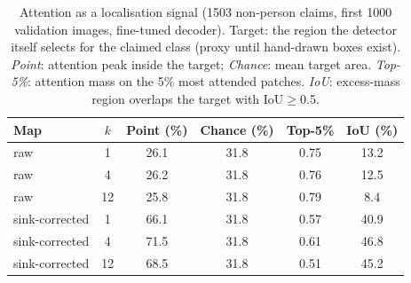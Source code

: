 \begin{table}[t]
\caption{Attention as a localisation signal (1503 non-person claims, first 1000 validation images,
fine-tuned decoder). Target: the region the detector itself selects
for the claimed class (proxy until hand-drawn boxes exist). \emph{Point}: attention peak inside the target;
\emph{Chance}: mean target area. \emph{Top-5\%}: attention mass on the 5\% most attended patches.
\emph{IoU}: excess-mass region overlaps the target with IoU$\geq$0.5.}
\label{tab:attn}
\centering\footnotesize\setlength{\tabcolsep}{4pt}
\begin{tabular}{@{}lccccc@{}}
\toprule
Map & $k$ & Point (\%) & Chance (\%) & Top-5\% & IoU (\%) \\
\midrule
raw & 1 & 26.1 & 31.8 & 0.75 & 13.2 \\
raw & 4 & 26.2 & 31.8 & 0.76 & 12.5 \\
raw & 12 & 25.8 & 31.8 & 0.79 & 8.4 \\
sink-corrected & 1 & 66.1 & 31.8 & 0.57 & 40.9 \\
sink-corrected & 4 & 71.5 & 31.8 & 0.61 & 46.8 \\
sink-corrected & 12 & 68.5 & 31.8 & 0.51 & 45.2 \\
\bottomrule
\end{tabular}
\end{table}
